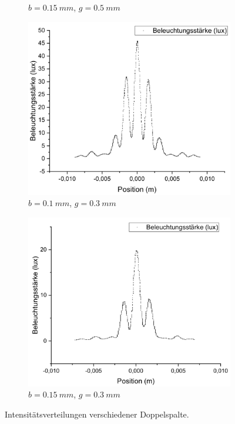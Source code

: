 \documentclass[
	a4paper,
	12pt,
	pagesize,
	ngerman
]{scrartcl}
\begin{document}
\begin{figure}[H]
\begin{subfigure}{.5\textwidth}
			\caption{$b=\SI{0,15}{mm}$, $ g=\SI{0,5}{mm}$}
		\end{subfigure}
		\begin{subfigure}{.5\textwidth}
			\centering
			\includegraphics[width=1\linewidth]{Doppelspaltb0-10mmg0-30mm}
			\caption{$b=\SI{0,1}{mm}$, $ g=\SI{0,3}{mm}$}	
		\end{subfigure}%
		\begin{subfigure}{.5\textwidth}
			\centering
			\includegraphics[width=1\linewidth]{Doppelspaltb0-15mmg0-30mm}
			\caption{$b=\SI{0,15}{mm}$, $ g=\SI{0,3}{mm}$}
		\end{subfigure}
		\caption{Intensitätsverteilungen verschiedener Doppelspalte.}
		\label{Doppelspaltvergleich}
	\end{figure}
	
\end{document}
